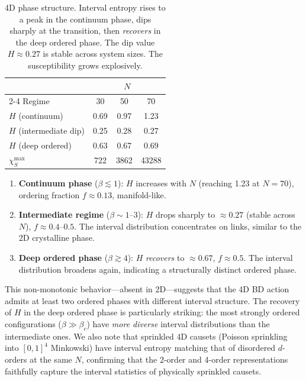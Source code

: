 \documentclass[aps,prd,twocolumn,superscriptaddress,nofootinbib]{revtex4-2}
\begin{document}
\begin{table}[h]
\centering
\begin{tabular}{lccc}
\toprule
& \multicolumn{3}{c}{$N$} \\
\cmidrule{2-4}
Regime & 30 & 50 & 70 \\
\midrule
$H$ (continuum) & 0.69 & 0.97 & 1.23 \\
$H$ (intermediate dip) & 0.25 & 0.28 & 0.27 \\
$H$ (deep ordered) & 0.63 & 0.67 & 0.69 \\
$\chi_S^{\max}$ & 722 & 3862 & 43288 \\
\bottomrule
\end{tabular}
\caption{4D phase structure. Interval entropy rises to a peak in the continuum phase, dips sharply at the transition, then \emph{recovers} in the deep ordered phase. The dip value $H \approx 0.27$ is stable across system sizes. The susceptibility grows explosively.}
\label{tab:4d}
\end{table}

\begin{enumerate}
\item \textbf{Continuum phase} ($\beta \lesssim 1$): $H$ increases with $N$ (reaching 1.23 at $N = 70$), ordering fraction $f \approx 0.13$, manifold-like.
\item \textbf{Intermediate regime} ($\beta \sim 1$--$3$): $H$ drops sharply to $\approx 0.27$ (stable across $N$), $f \approx 0.4$--$0.5$. The interval distribution concentrates on links, similar to the 2D crystalline phase.
\item \textbf{Deep ordered phase} ($\beta \gtrsim 4$): $H$ \emph{recovers} to $\approx 0.67$, $f \approx 0.5$. The interval distribution broadens again, indicating a structurally distinct ordered phase.
\end{enumerate}

This non-monotonic behavior---absent in 2D---suggests that the 4D BD action admits at least two ordered phases with different interval structure. The recovery of $H$ in the deep ordered phase is particularly striking: the most strongly ordered configurations ($\beta \gg \beta_c$) have \emph{more diverse} interval distributions than the intermediate ones. We also note that sprinkled 4D causets (Poisson sprinkling into $[0,1]^4$ Minkowski) have interval entropy matching that of disordered $d$-orders at the same $N$, confirming that the 2-order and 4-order representations faithfully capture the interval statistics of physically sprinkled causets.
\end{document}
